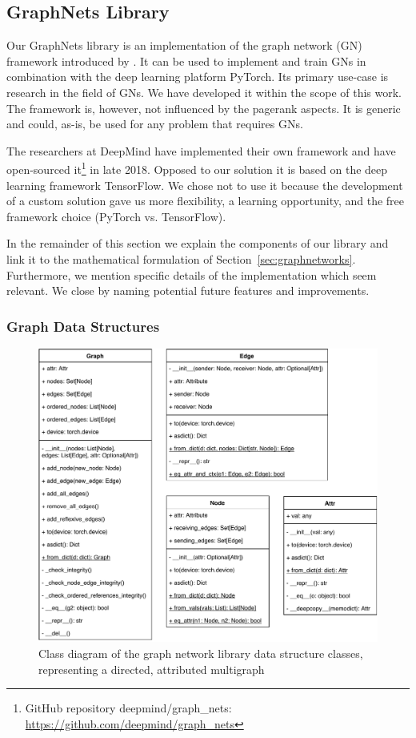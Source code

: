 \subsection{GraphNets Library}
\label{sec:gnlib}

Our GraphNets library is an implementation of the graph network (GN) framework introduced by \cite{deepmind:graphnets}. It can be used to implement and train GNs in combination with the deep learning platform PyTorch. Its primary use-case is research in the field of GNs. We have developed it within the scope of this work. The framework is, however, not influenced by the pagerank aspects. It is generic and could, as-is, be used for any problem that requires GNs.

The researchers at DeepMind have implemented their own framework and have open-sourced it\footnote{GitHub repository deepmind/graph\_nets: \url{https://github.com/deepmind/graph_nets}} in late 2018. Opposed to our solution it is based on the deep learning framework TensorFlow. We chose not to use it because the development of a custom solution gave us more flexibility, a learning opportunity, and the free framework choice (PyTorch vs. TensorFlow).

In the remainder of this section we explain the components of our library and link it to the mathematical formulation of Section~\ref{sec:graphnetworks}. Furthermore, we mention specific details of the implementation which seem relevant. We close by naming potential future features and improvements.

\subsubsection{Graph Data Structures}

\begin{figure}\centering
    \includegraphics[scale=0.65]{resources/graphnets-datastructs}
    \caption[Class diagram of the graph network library data structure classes]{Class diagram of the graph network library data structure classes, representing a directed, attributed multigraph}\label{fig:classdiagramgndatastructs}
\end{figure}

